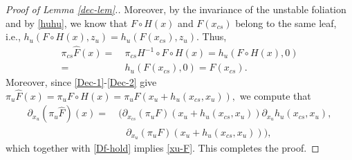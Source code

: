 \documentclass[10pt,a4paper]{amsart}
\begin{document}
\begin{proof}[Proof of Lemma {\rm \ref{dec-lem}.}]
Moreover, by the invariance of the unstable foliation and by \eqref{huhu}, we know that $F\circ H(x)$
and $F(x_{cs})$ belong to the same leaf, i.e.,
$
h_u(F\circ H(x),z_u)=h_u(F(x_{cs}),z_u).
$
Thus,
\begin{align*}
\pi_{cs}\hat F(x)=&~\pi_{cs}H^{-1} \circ F \circ H(x) =h_u(F \circ H(x),0)
\\
=&~ h_u(F(x_{cs}),0)=F(x_{cs}).
\end{align*}
Moreover, since \eqref{Dec-1}-\eqref{Dec-2} give
$
\pi_{u}\hat F(x)=\pi_{u}F \circ H(x)=\pi_{u}F(x_u+ h_u(x_{cs}, x_u)),
$
we compute that
\begin{align*}
\partial_{x_u} (\pi_{u}\hat F)(x)=&~ \Big(\partial_{x_{cs}}(\pi_{u}F)(x_u+ h_u(x_{cs}, x_u))\partial_{x_u} h_u(x_{cs}, x_u),
\\
&\quad  \partial_{x_u}(\pi_{u}F)(x_u+ h_u(x_{cs}, x_u))\Big),
\end{align*}
which together with \eqref{Df-hold} implies \eqref{xu-F}.
This completes the proof.
\end{proof}
\end{document}
